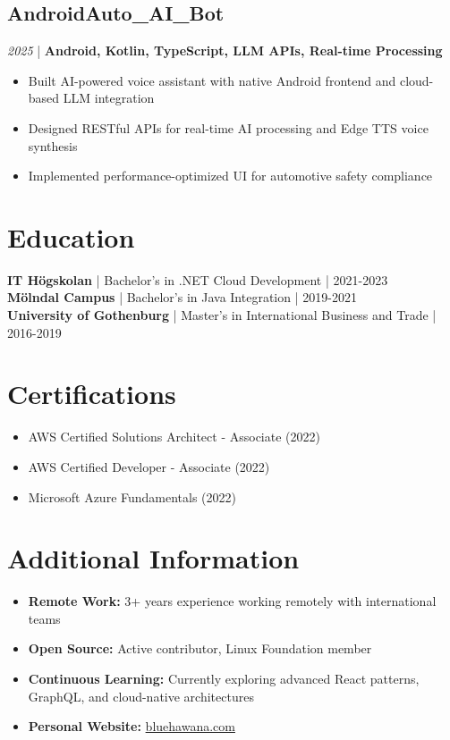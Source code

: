 \documentclass[11pt,a4paper]{article}
\begin{document}
\subsection*{AndroidAuto\_AI\_Bot}
\textit{2025} | \textbf{Android, Kotlin, TypeScript, LLM APIs, Real-time Processing}
\begin{itemize}[noitemsep]
\item Built AI-powered voice assistant with native Android frontend and cloud-based LLM integration
\item Designed RESTful APIs for real-time AI processing and Edge TTS voice synthesis
\item Implemented performance-optimized UI for automotive safety compliance
\end{itemize}

\section*{Education}
\textbf{IT Högskolan} | Bachelor's in .NET Cloud Development | 2021-2023\\
\textbf{Mölndal Campus} | Bachelor's in Java Integration | 2019-2021\\
\textbf{University of Gothenburg} | Master's in International Business and Trade | 2016-2019

\section*{Certifications}
\begin{itemize}[noitemsep]
\item AWS Certified Solutions Architect - Associate (2022)
\item AWS Certified Developer - Associate (2022)
\item Microsoft Azure Fundamentals (2022)
\end{itemize}

\section*{Additional Information}
\begin{itemize}[noitemsep]
\item \textbf{Remote Work:} 3+ years experience working remotely with international teams
\item \textbf{Open Source:} Active contributor, Linux Foundation member
\item \textbf{Continuous Learning:} Currently exploring advanced React patterns, GraphQL, and cloud-native architectures
\item \textbf{Personal Website:} \href{https://www.bluehawana.com}{bluehawana.com}
\end{itemize}
\end{document}
